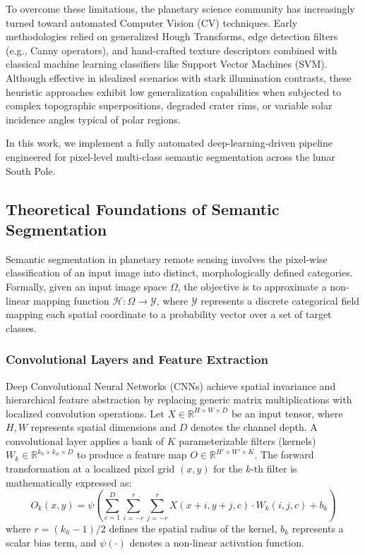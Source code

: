 \documentclass{aa}
\begin{document}
To overcome these limitations, the planetary
science community has increasingly turned toward
automated Computer Vision (CV) techniques. Early
methodologies relied on generalized Hough
Transforms, edge detection filters (e.g., Canny
operators), and hand-crafted texture descriptors
combined with classical machine learning
classifiers like Support Vector Machines (SVM).
Although effective in idealized scenarios with
stark illumination contrasts, these heuristic
approaches exhibit low generalization capabilities
when subjected to complex topographic
superpositions, degraded crater rims, or variable
solar incidence angles typical of polar regions.

In this work, we implement a fully automated deep-learning-driven pipeline engineered for pixel-level multi-class semantic segmentation across the lunar South Pole.

\subsection{Theoretical Foundations of Semantic Segmentation}

Semantic segmentation in planetary remote sensing involves the pixel-wise classification of an input image into distinct, morphologically defined categories. Formally, given an input image space $\Omega$, the objective is to approximate a non-linear mapping function $\mathcal{H}: \Omega \rightarrow \mathcal{Y}$, where $\mathcal{Y}$ represents a discrete categorical field mapping each spatial coordinate to a probability vector over a set of target classes.

\subsubsection{Convolutional Layers and Feature Extraction}

Deep Convolutional Neural Networks (CNNs) achieve spatial invariance and hierarchical feature abstraction by replacing generic matrix multiplications with localized convolution operations. Let $X \in \mathbb{R}^{H \times W \times D}$ be an input tensor, where $H, W$ represents spatial dimensions and $D$ denotes the channel depth. A convolutional layer applies a bank of $K$ parameterizable filters (kernels) $W_k \in \mathbb{R}^{k_h \times k_w \times D}$ to produce a feature map $O \in \mathbb{R}^{H' \times W' \times K}$. The forward transformation at a localized pixel grid $(x, y)$ for the $k$-th filter is mathematically expressed as:
\begin{equation*}
O_k(x, y) = \psi \left( \sum_{c=1}^{D} \sum_{i=-r}^{r} \sum_{j=-r}^{r} X(x+i, y+j, c) \cdot W_k(i, j, c) + b_k \right)
\end{equation*}
where $r = (k_h - 1) / 2$ defines the spatial radius of the kernel, $b_k$ represents a scalar bias term, and $\psi(\cdot)$ denotes a non-linear activation function.
\end{document}
